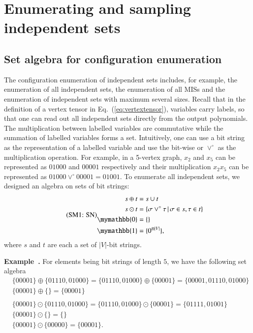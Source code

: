 \documentclass[onefignum, onetabnum]{siamart190516}
\newcommand{\eqname}[1]{\stepcounter{equation}\tag{\theequation : #1}}
\newcommand{\<}{\langle}
\renewcommand{\>}{\rangle}
\newcommand{\Eq}[1]{Eq.~(\ref{#1})}
\newcounter{example}
\newenvironment{example}[1][]{\refstepcounter{example}\par\medskip
   \noindent \textbf{Example~\theexample. #1} \rmfamily}{\medskip}
\begin{document}
\section{Enumerating and sampling independent sets}\label{sec:enumeration}

\subsection{Set algebra for configuration enumeration}
The configuration enumeration of independent sets includes,
for example, the enumeration of all independent sets, the enumeration of all MISs and the enumeration of independent sets with maximum several sizes.
Recall that in the definition of a vertex tensor in \Eq{eq:vertextensor}, variables carry labels, so that one can read out all independent sets directly from the output polynomials.
The multiplication between labelled variables are commutative while the summation of labelled variables forms a set.
Intuitively, one can use a bit string as the representation of a labelled variable and use the bit-wise or $\lor^\circ$ as the multiplication operation.
For example, in a 5-vertex graph, $x_2$ and $x_5$ can be represented as $01000$ and $00001$ respectively and their multiplication $x_2x_5$ can be represented as $01000 \lor^\circ 00001 = 01001$.
To enumerate all independent sets, we designed an algebra on sets of bit strings:
\begin{equation}
\eqname{SN}
\begin{split}
    s \oplus t &= s \cup t\\
    s \odot t &= \{\sigma \lor^\circ \tau \, | \, \sigma \in s, \tau \in t\}\\
    \mymathbb{0} &= \{\}\\
    \mymathbb{1} &= \{0^{\otimes |V|}\},
\end{split}\label{eq:set}
\end{equation}
where $s$ and $t$ are each a set of $|V|$-bit strings.
\begin{example}\label{eg:setalgebra}
    For elements being bit strings of length $5$, we have the following set algebra
\begin{equation*}
\begin{split}
    &\{00001\} \oplus \{01110, 01000\} = \{01110, 01000\} \oplus \{00001\} = \{00001,01110, 01000\}\\
    &\{00001\} \oplus \{\} = \{00001\}\\
&\\
    &\{00001\} \odot \{01110, 01000\} = \{01110, 01000\} \odot \{00001\} = \{01111, 01001\}\\
    &\{00001\} \odot \{\} = \{\}\\
    &\{00001\} \odot \{00000\} = \{00001\}.
\end{split}
\end{equation*}
\end{example}
\end{document}
